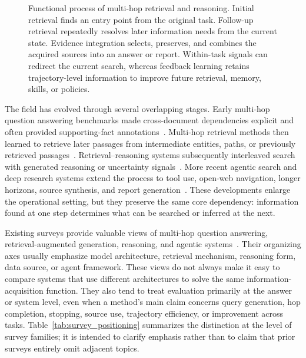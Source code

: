\begin{figure}[tbp]
\centering
\resizebox{0.98\textwidth}{!}{}
\caption{Functional process of multi-hop retrieval and reasoning. Initial retrieval finds an entry point from the original task. Follow-up retrieval repeatedly resolves later information needs from the current state. Evidence integration selects, preserves, and combines the acquired sources into an answer or report. Within-task signals can redirect the current search, whereas feedback learning retains trajectory-level information to improve future retrieval, memory, skills, or policies.}
\label{fig:functional_process}
\end{figure}

The field has evolved through several overlapping stages. Early multi-hop question answering benchmarks made cross-document dependencies explicit and often provided supporting-fact annotations~\cite{welbl2018qangaroo,yang2018hotpotqa,trivedi2022musique}. Multi-hop retrieval methods then learned to retrieve later passages from intermediate entities, paths, or previously retrieved passages~\cite{min2019golden,xiong2021mdr,khattab2021baleen}. Retrieval--reasoning systems subsequently interleaved search with generated reasoning or uncertainty signals~\cite{trivedi2023ircot,jiang2023flare,asai2024selfrag,jeong2024adaptiverag}. More recent agentic search and deep research systems extend the process to tool use, open-web navigation, longer horizons, source synthesis, and report generation~\cite{nakano2021webgpt,yao2023react,lala2023paperqa,jin2025searchr1}. These developments enlarge the operational setting, but they preserve the same core dependency: information found at one step determines what can be searched or inferred at the next.

Existing surveys provide valuable views of multi-hop question answering, retrieval-augmented generation, reasoning, and agentic systems~\cite{mavi2022mhqasurvey,gao2023ragsurvey,fan2024ragllmsurvey,singh2025agenticragsurvey}. Their organizing axes usually emphasize model architecture, retrieval mechanism, reasoning form, data source, or agent framework. These views do not always make it easy to compare systems that use different architectures to solve the same information-acquisition function. They also tend to treat evaluation primarily at the answer or system level, even when a method's main claim concerns query generation, hop completion, stopping, source use, trajectory efficiency, or improvement across tasks. Table~\ref{tab:survey_positioning} summarizes the distinction at the level of survey families; it is intended to clarify emphasis rather than to claim that prior surveys entirely omit adjacent topics.

